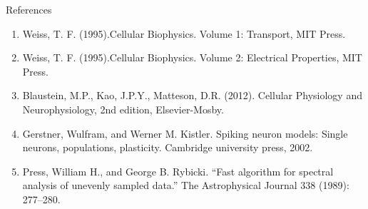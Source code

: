 \documentclass{beamer}
\begin{document}
\begin{frame}{References}
\begin{enumerate}
\item Weiss, T. F. (1995).Cellular Biophysics. Volume 1: Transport, MIT Press.
\item Weiss, T. F. (1995).Cellular Biophysics. Volume 2: Electrical Properties, MIT Press.
\item Blaustein, M.P., Kao, J.P.Y., Matteson, D.R. (2012). Cellular Physiology and Neurophysiology, 2nd edition, Elsevier-Mosby.
\item Gerstner, Wulfram, and Werner M. Kistler. Spiking neuron models: Single neurons, populations, plasticity. Cambridge university press, 2002.
\item Press, William H., and George B. Rybicki. ``Fast algorithm for spectral analysis of unevenly sampled data.'' The Astrophysical Journal 338 (1989): 277--280.
\end{enumerate}
\end{frame}
\end{document}
